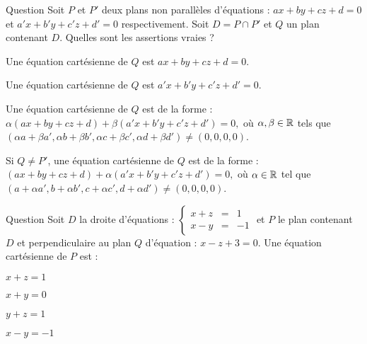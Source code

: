 \begin{multi}[multiple,feedback=
{\(\vec{n}(a,b,c)\) est un vecteur normal à \(P\) et \(\vec{n'}(a',b',c')\) est un vecteur normal à \(P'\), donc un vecteur normal à \(Q\) est une combinaison linéaire de \(\vec{n}\) et \(\vec{n'}\). Par conséquent, une équation cartésienne de \(Q\) est de la forme :  \(\alpha(ax+by+cz)+\beta(a'x+b'y+c'z) + \gamma =0.\) D'autre part, si \(A(x_0,y_0,z_0) \in D\), \(A \in Q\). On déduit que \(\gamma = \alpha d + \beta d'\).
}]{Question}
Soit \(P\) et \(P'\) deux plans non parallèles d'équations :  \(ax+by+cz+d =0\) et \(a'x+b'y+c'z+d' =0\) respectivement. Soit \(D=P\cap P'\) et \(Q\) un plan contenant \(D\). Quelles sont les assertions vraies ?

    \item Une équation cartésienne de \(Q\) est \(ax+by+cz+d =0\).
    \item Une équation cartésienne de \(Q\) est \(a'x+b'y+c'z+d' =0\).
    \item* Une équation cartésienne de \(Q\) est  de la forme : \(\alpha(ax+by+cz+d)+\beta(a'x+b'y+c'z+d')=0,\)  où \( \alpha, \beta \in \mathbb{R}\)  tels que  \((\alpha a+ \beta a', \alpha b+ \beta b', \alpha c+ \beta c', \alpha d+ \beta d') \neq (0,0,0,0)\).
    \item* Si \(Q\neq P'\), une équation cartésienne de \(Q\) est de la forme :
\((ax+by+cz+d)+\alpha(a'x+b'y+c'z+d')=0, \) où \( \alpha \in \mathbb{R}\)  tel que \( (a+ \alpha a',  b+ \alpha b', c+ \alpha c',  d+ \alpha d') \neq (0,0,0,0)\).
\end{multi}


\begin{multi}[multiple,feedback=
{\(\vec{u}(1,0,-1)\) est un vecteur normal à \( Q\) qui n'appartient pas au  plan vectoriel \(x-y=0\). Donc \(P\) est différent du plan d'équation : \(x-y=-1\) et donc  une équation cartésienne de \(P\) est  de la forme : \((x+z-1) + \alpha(x-y+1)=0, \, \alpha \in \Rr\). On calcule \(\alpha\) de sorte que \(\vec{u}(1,0,-1)\) soit un vecteur de  \(P\).
}]{Question}
Soit \(D\) la droite d'équations :  \( \left\{\begin{array}{ccl}x+z&=&1\\x-y&=&-1 \end{array}\right.\) et \(P\) le plan contenant \(D\) et perpendiculaire au plan \(Q\) d'équation : \(x-z+3=0\).  Une équation cartésienne de \(P\) est :

    \item* \(x+z=1\)
    \item \(x+y=0\)
    \item \(y+z=1\)
    \item \(x-y=-1\)
\end{multi}



